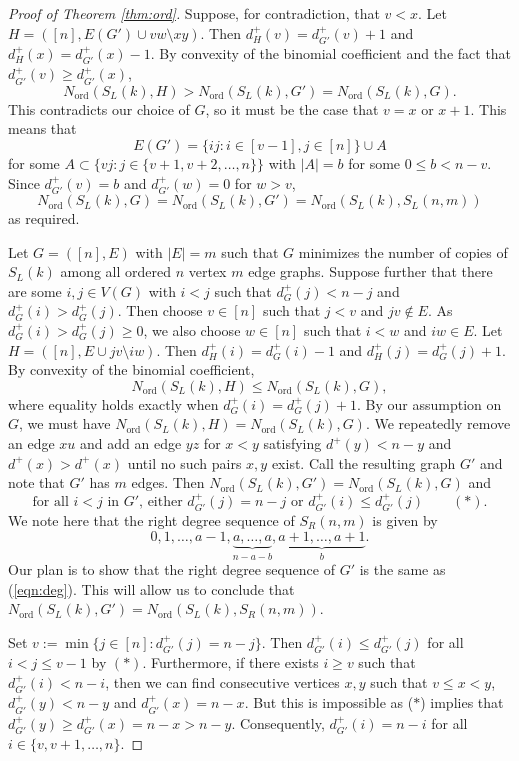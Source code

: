 \documentclass[11pt]{article}
\newcommand{\ord}{{\operatorname{ord}}}
\theoremstyle{definition}
\begin{document}
\begin{proof}[Proof of Theorem \ref{thm:ord}]
    Suppose, for contradiction, that $v < x$. Let $H = ([n], E(G') \cup vw \setminus xy)$. Then $d^+_H(v)=d^+_{G'}(v)+1$ and $d^+_H(x)=d^+_{G'}(x)-1$.
    By convexity of the binomial coefficient and the fact that $d_{G'}^+ (v) \ge d_{G'}^+ (x)$, 
    \[N_\ord (S_L (k), H) > N_\ord (S_L (k), G')= N_\ord (S_L (k), G). \] This contradicts our choice of $G$, so it must be the case that $v=x$ or $x+1$.  This means that \[ E(G') = \{ ij : i \in [v-1], j\in [n] \} \cup A \] for some $A \subset \{ vj : j \in \{v+1, v+2, \ldots, n\} \}$ with $|A| = b$ for some $0 \le b < n-v$. Since $d^{+}_{G'}(v)=b$ and $d^+_{G'}(w)=0$ for $w>v$, 
    \[N_\ord (S_L (k), G) = N_\ord (S_L (k), G')
    =N_\ord (S_L (k), S_L (n,m))\]
    as required.

    Let $G=([n], E)$ with $|E|=m$ such that $G$ minimizes the number of copies of $S_L (k)$ among all ordered $n$ vertex $m$ edge graphs. Suppose further that there are some $i,j \in V(G)$ with $i < j$ such that $d^+_G (j) < n-j$ and $d^+_G(i) > d^+_G(j)$. Then choose $v \in [n]$ such that $j < v$ and $jv \notin E$. As $d^+_G(i) > d^+_G (j) \ge 0$, we also choose $w \in [n]$ such that $i < w$ and $iw \in E$. Let $H = ([n], E \cup jv \setminus iw)$. Then $d^+_H(i)=d^+_{G}(i)-1$ and $d^+_H(j)=d^+_{G}(j)+1$. By convexity of the binomial coefficient, 
    \[N_\ord (S_L (k), H)\leq N_\ord (S_L (k), G),\] where equality holds exactly when $d_G^+(i) = d_G^+(j) + 1$. By our assumption on $G$, we must have $N_\ord (S_L (k), H) = N_\ord (S_L (k), G)$. We repeatedly remove an edge $xu$ and add an edge $yz$ for $x < y$ satisfying $d^+ (y) < n-y$ and $d^+(x) > d^+(x)$ until no such pairs $x,y$ exist.
    Call the resulting graph $G'$ and note that $G'$ has $m$ edges. Then $N_\ord (S_L (k), G') = N_\ord (S_L (k), G)$ and \[\text{for all $i < j$ in $G'$, either $d^+_{G'} (j) = n - j$ or $d^+_{G'} (i) \le d^+_{G'} (j)$} \qquad(*).\] 
    We note here that the right degree sequence of $S_R(n,m)$ is given by \begin{equation}\label{eqn:deg}
        0,1,\ldots, a-1, \underbrace{a, \ldots, a}_{n-a-b}, \underbrace{a+1, \ldots, a+1}_{b}.
    \end{equation}
    Our plan is to show that the right degree sequence of $G'$ is the same as (\ref{eqn:deg}). This will allow us to conclude that $N_\ord (S_L (k), G') =N_\ord (S_L (k), S_R (n,m))$.
    
    Set $v := \min \{ j \in [n] : d^+_{G'} (j) = n-j \}$. Then $d^+_{G'} (i) \le d^+_{G'} (j)$ for all $i < j \le v-1$ by $(*)$. Furthermore,  if there exists $i\ge v$ such that $d^+_{G'} (i) < n - i$, then we can find consecutive vertices $x,y$ such that $v \le x<y$, $d^+_{G'}(y)<n-y$
    and $d^+_{G'}(x)=n-x$. But this is impossible as ($*$) implies that  $d^+_{G'}(y)\ge d^+_{G'}(x)=n-x>n-y$.
    Consequently, $d^+_{G'} (i) = n - i$
    for all $i \in \{ v, v+1, \ldots, n \}$. 
    

\end{proof}
\end{document}
